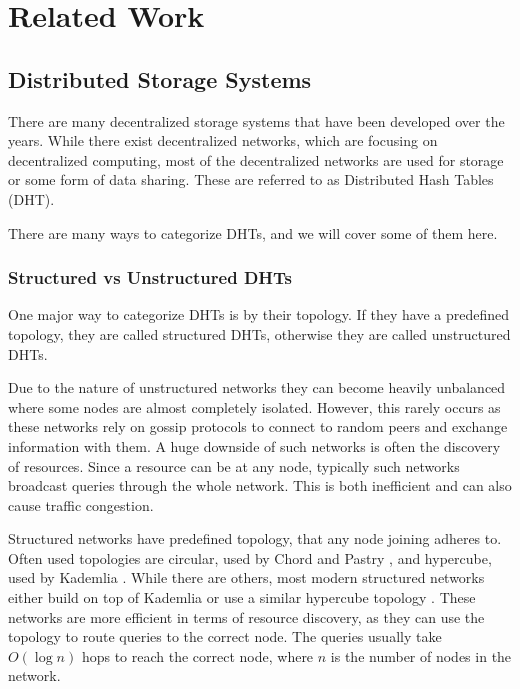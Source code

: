 \label{chapter:related-work}
\chapter{Related Work}

\section{Distributed Storage Systems}

There are many decentralized storage systems that have been developed over the years.
While there exist decentralized networks, which are focusing on decentralized computing,
most of the decentralized networks are used for storage or some form of data sharing.
These are referred to as Distributed Hash Tables (DHT).

There are many ways to categorize DHTs, and we will cover some of them here.

\subsection{Structured vs Unstructured DHTs}

One major way to categorize DHTs is by their topology.
If they have a predefined topology, they are called structured DHTs, otherwise they are called unstructured DHTs.

Due to the nature of unstructured networks they can become heavily unbalanced
where some nodes are almost completely isolated.
However, this rarely occurs as these networks rely on gossip protocols to connect to random peers and exchange
information with them.
A huge downside of such networks is often the discovery of resources.
Since a resource can be at any node, typically such networks broadcast queries through the whole network.
This is both inefficient and can also cause traffic congestion.

Structured networks have predefined topology, that any node joining adheres to.
Often used topologies are circular, used by Chord \cite{chord} and Pastry \cite{pastry},
and hypercube, used by Kademlia \cite{kademlia}.
While there are others, most modern structured networks either build on top of Kademlia or
use a similar hypercube topology \cite{skademlia}.
These networks are more efficient in terms of resource discovery, as they can use the topology to
route queries to the correct node.
The queries usually take $O(\log n)$ hops to reach the correct node, where $n$ is the number of
nodes in the network.

